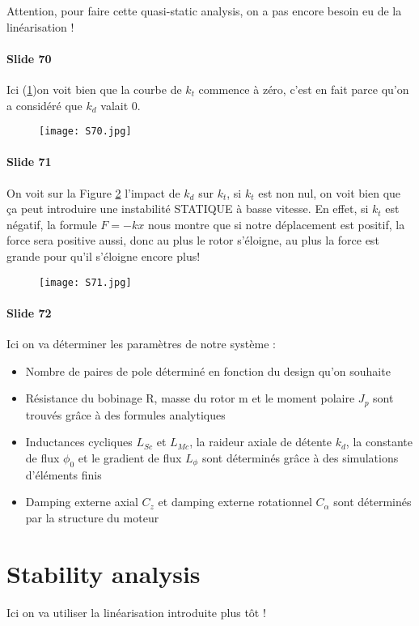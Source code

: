 Attention, pour faire cette quasi-static analysis, on a pas encore besoin eu de la linéarisation !

\paragraph{Slide 70} Ici (\ref{fig:S70})on voit bien que la courbe de $k_t$ commence à zéro, c'est en fait parce qu'on a considéré que $k_d$ valait 0.
\begin{figure}[H]
    \centering
    \texttt{[image: S70.jpg]}
    \caption{}
    \label{fig:S70}
\end{figure}
\paragraph{Slide 71} On voit sur la Figure \ref{fig:S71} l'impact de $k_d$ sur $k_t$, si $k_t$ est non nul, on voit bien que ça peut introduire une instabilité STATIQUE à basse vitesse. En effet, si $k_t$ est négatif, la formule $F = -kx$ nous montre que si notre déplacement est positif, la force sera positive aussi, donc au plus le rotor s'éloigne, au plus la force est grande pour qu'il s'éloigne encore plus!
\begin{figure}[H]
    \centering
    \texttt{[image: S71.jpg]}
    \caption{}
    \label{fig:S71}
\end{figure}

\paragraph{Slide 72} Ici on va déterminer les paramètres de notre système :

\begin{itemize}
    \item Nombre de paires de pole déterminé en fonction du design qu'on souhaite
    \item Résistance du bobinage R, masse du rotor m et le moment polaire $J_p$ sont trouvés grâce à des formules analytiques
    \item Inductances cycliques $L_{Sc}$ et $L_{Mc}$, la raideur axiale de détente $k_d$, la constante de flux $\phi_0$ et le gradient de flux $L_\phi$ sont déterminés grâce à des simulations d'éléments finis
    \item Damping externe axial $C_z$ et damping externe rotationnel $C_\alpha$ sont déterminés par la structure du moteur
\end{itemize}
\section{Stability analysis}
Ici on va utiliser la linéarisation introduite plus tôt !

